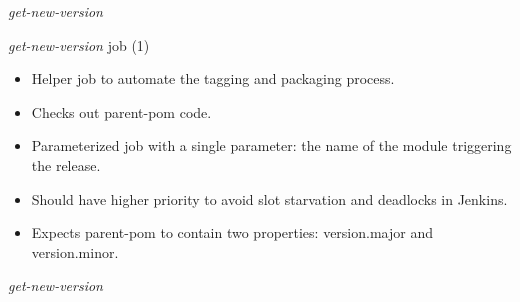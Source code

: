 \documentclass[presentation]{beamer}
\begin{document}
{
\begin{frame}[label=sec-3-2]{\textit{get-new-version}}

\begin{block}{\textit{get-new-version} job (1)}

\begin{itemize}
\item Helper job to automate the tagging and packaging process.
\item Checks out parent-pom code.
\item Parameterized job with a single parameter: the name of the module triggering the release.
\item Should have higher priority to avoid slot starvation and deadlocks in Jenkins.
\item Expects parent-pom to contain two properties: version.major and version.minor.
\end{itemize}
\end{block}
\end{frame}} %


{
\begin{frame}[label=sec-3-3]{\textit{get-new-version}}

\begin{columns}
\begin{column}{0.6\textwidth}
\begin{quotation} %

\end{quotation}
\end{column}
\end{columns}
\end{frame}} %
\end{document}

